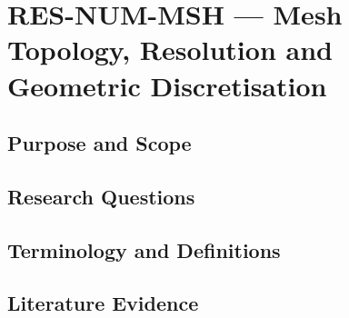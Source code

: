 
\section{RES-NUM-MSH --- Mesh Topology, Resolution and Geometric Discretisation}
\label{sec:res-num-msh}

\subsection{Purpose and Scope}
\label{sec:res-num-msh-purpose}


\subsection{Research Questions}
\label{sec:res-num-msh-research-questions}


\subsection{Terminology and Definitions}
\label{sec:res-num-msh-definitions}


\subsection{Literature Evidence}
\label{sec:res-num-msh-literature-evidence}

%

